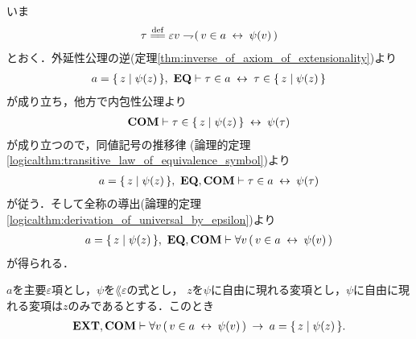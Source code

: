 	\begin{sketch}
		いま
		\begin{align}
			\tau \defeq \varepsilon v \negation (\, v \in a \lrarrow \psi(v)\, )
		\end{align}
		とおく．外延性公理の逆(定理\ref{thm:inverse_of_axiom_of_extensionality})より
		\begin{align}
			a = \{\, z \mid \psi(z)\, \},\ \mbox{{\bf EQ}} \vdash 
			\tau \in a \hspace{0.25em}\leftrightarrow\hspace{0.25em} \tau \in \{\, z \mid \psi(z)\, \}
		\end{align}
		が成り立ち，他方で内包性公理より
		\begin{align}
			\mbox{\bf COM} \vdash \tau \in \{\, z \mid \psi(z)\, \} \hspace{0.25em}\leftrightarrow\hspace{0.25em} \psi(\tau)
		\end{align}
		が成り立つので，同値記号の推移律
		(論理的定理\ref{logicalthm:transitive_law_of_equivalence_symbol})より
		\begin{align}
			a = \{\, z \mid \psi(z)\, \},\ \mbox{{\bf EQ}},\mbox{\bf COM} \vdash \tau \in a \hspace{0.25em}\leftrightarrow\hspace{0.25em} \psi(\tau)
		\end{align}
		が従う．そして全称の導出(論理的定理\ref{logicalthm:derivation_of_universal_by_epsilon})より
		\begin{align}
			a = \{\, z \mid \psi(z)\, \},\ \mbox{{\bf EQ}},\mbox{\bf COM} \vdash 
			\forall v\, (\, v \in a \hspace{0.25em}\leftrightarrow\hspace{0.25em} \psi(v)\, )
		\end{align}
		が得られる．
		\QED
	\end{sketch}
	
	\begin{screen}
		\begin{thm}
		\label{thm:equivalent_formula_rewriting_2}
			$a$を主要$\varepsilon$項とし，$\psi$を$\lang{\varepsilon}$の式とし，
			$z$を$\psi$に自由に現れる変項とし，$\psi$に自由に現れる変項は$z$のみであるとする．このとき
			\begin{align}
				\mbox{{\bf EXT}},\mbox{\bf COM} \vdash \forall v\, (\, v \in a \hspace{0.25em}\leftrightarrow\hspace{0.25em} \psi(v)\, )
				\hspace{0.25em}\rightarrow\hspace{0.25em} a = \{\, z \mid \psi(z)\, \}.
			\end{align}
		\end{thm}
	\end{screen}
	
